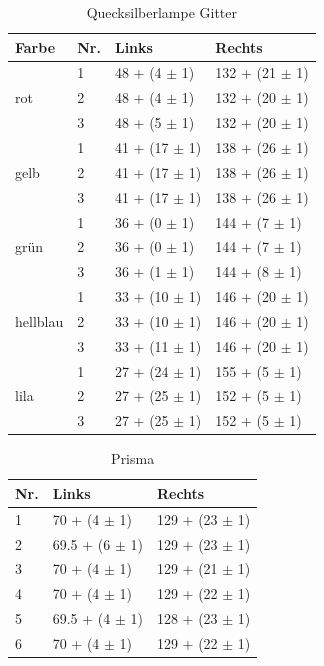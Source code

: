 \documentclass[12pt,a4paper,twoside]{article}
\begin{document}
\begin{table}[H]
    \centering
    \caption{Quecksilberlampe Gitter}
    \label{tab:Gitter v2}
    \begin{tabular}{| l | l | l | l |}
        \hline
        Farbe & Nr. & Links  & Rechts \\
        \hline
        \hline
                &  1 & 48 + (4 $\pm$ 1) & 132 + (21 $\pm$ 1) \\
        rot     &  2 & 48 + (4 $\pm$ 1) & 132 + (20 $\pm$ 1) \\
                &  3 & 48 + (5 $\pm$ 1) & 132 + (20 $\pm$ 1) \\
        \hline
                &  1 & 41 + (17 $\pm$ 1) & 138 + (26 $\pm$ 1) \\
        gelb    &  2 & 41 + (17 $\pm$ 1) & 138 + (26 $\pm$ 1) \\
                &  3 & 41 + (17 $\pm$ 1) & 138 + (26 $\pm$ 1) \\
        \hline
                &  1 & 36 + (0 $\pm$ 1) & 144 + (7 $\pm$ 1) \\
        grün    &  2 & 36 + (0 $\pm$ 1) & 144 + (7 $\pm$ 1) \\
                &  3 & 36 + (1 $\pm$ 1) & 144 + (8 $\pm$ 1) \\
        \hline
                &  1 & 33 + (10 $\pm$ 1) & 146 + (20 $\pm$ 1) \\
        hellblau&  2 & 33 + (10 $\pm$ 1) & 146 + (20 $\pm$ 1) \\
                &  3 & 33 + (11 $\pm$ 1) & 146 + (20 $\pm$ 1) \\
        \hline
                &  1 & 27 + (24 $\pm$ 1) & 155 + (5 $\pm$ 1) \\
        lila    &  2 & 27 + (25 $\pm$ 1) & 152 + (5 $\pm$ 1) \\
                &  3 & 27 + (25 $\pm$ 1) & 152 + (5 $\pm$ 1) \\
        \hline
    \end{tabular}
\end{table}


\begin{table}[H]
    \centering
    \caption{Prisma}
    \label{tab:Prisma}
    \begin{tabular}{| l | l | l |}
        \hline
        Nr.  & Links  & Rechts \\
        \hline
        1 & 70 +    (4 $\pm$ 1) & 129 + (23 $\pm$ 1) \\
        2 & 69.5 +  (6 $\pm$ 1) & 129 + (23 $\pm$ 1) \\
        3 & 70 +    (4 $\pm$ 1) & 129 + (21 $\pm$ 1) \\
        4 & 70 +    (4 $\pm$ 1) & 129 + (22 $\pm$ 1) \\
        5 & 69.5 +  (4 $\pm$ 1) & 128 + (23 $\pm$ 1) \\
        6 & 70 +    (4 $\pm$ 1) & 129 + (22 $\pm$ 1) \\
        \hline
    \end{tabular}
\end{table}
\end{document}
